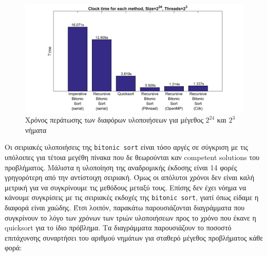 \documentclass[11pt,a4paper,titlepage]{article}
\begin{document}
		\begin{figure}[h!]
			\centering
			\includegraphics[width=\textwidth]{figures/figure-5.png}
			\caption{Χρόνος περάτωσης των διαφόρων υλοποιήσεων για μέγεθος $2^{24}$ και $2^3$ νήματα}
		\end{figure}
		Οι σειριακές υλοποιήσεις της \verb|bitonic sort| είναι τόσο αργές σε σύγκριση με τις υπόλοιπες για τέτοια μεγέθη πίνακα που δε θεωρούνται καν competent solutions του προβλήματος. Μάλιστα η υλοποίηση της αναδρομικής έκδοσης είναι 14 φορές γρηγορότερη από την αντίστοιχη σειριακή.
		Όμως οι απόλυτοι χρόνοι δεν είναι καλή μετρική για να συγκρίνουμε τις μεθόδους μεταξύ τους. Επίσης δεν έχει νόημα να κάνουμε συγκρίσεις με τις σειριακές εκδοχές της \verb|bitonic sort|, γιατί όπως είδαμε η διαφορά είναι χαώδης. Έτσι λοιπόν, παρακάτω παρουσιάζονται διαγράμματα που συγκρίνουν το λόγο των χρόνων των τριών υλοποιήσεων προς το χρόνο που έκανε η quicksort για το ίδιο πρόβλημα. Τα διαγράμματα παρουσιάζουν το ποσοστό επιτάχυνσης συναρτήσει του αριθμού νημάτων για σταθερό μέγεθος προβλήματος κάθε φορά:\\
		
\end{document}
